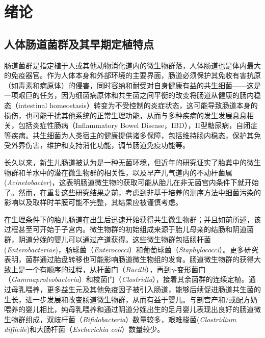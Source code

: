 
\chapter{绪论}
\label{chap:introduction}

\section{人体肠道菌群及其早期定植特点}
肠道菌群是指定植于人或其他动物消化道内的微生物群落，人体肠道也是体内最大的免疫器官。作为人体本身和外部环境的主要界面，肠道必须保护其免收有害抗原（如毒素和病原体）的侵害，同时容纳和耐受对自身健康有益的共生细菌——这是一项艰巨的任务，因为细菌病原体和共生菌之间平衡的改变将肠道从健康的肠内稳态（intestinal homeostasis）\cite{collier2005innate}转变为不受控制的炎症状态，这可能导致肠道本身的损伤，也可能干扰其他系统的正常生理功能，从而与多种疾病的发生发展息息相关，包括炎症性肠病（Inflammatory Bowel Disease，IBD）\cite{ni2017gut, yoo2017enteric}，II型糖尿病\cite{harsch2018role}，自闭症\cite{de2014altered, de2013fecal}等疾病。共生细菌为人类宿主的健康提供诸多保障，包括维持肠内稳态\cite{hooper2001commensal}，保护其免受外界伤害\cite{rakoff2004recognition}，维护和支持消化功能\cite{guarner2006mechanisms}，调节肠道免疫功能\cite{round2009gut,abreu2010toll}等。

长久以来，新生儿肠道被认为是一种无菌环境，但近年的研究证实了胎粪中的微生物群和羊水中的潜在微生物群的相关性\cite{ardissone2014meconium}，以及早产儿气道内的不动杆菌属(\textit{Acinetobacter})\cite{lohmann2014airway}，这表明肠道微生物的获取可能从胎儿在非无菌宫内条件下就开始了。然而，在重复这些研究结果之前，考虑到非基于培养的测序方法\cite{pennisi2014our}中细菌污染的影响以及取样时羊膜可能不完整，其结果应被谨慎考虑。

在生理条件下的胎儿肠道在出生后迅速开始获得共生微生物群；并且如前所述，该过程甚至可开始于子宫内。微生物群的初始组成来源于胎儿母亲的结肠和阴道菌群，阴道分娩的婴儿可以通过产道获得。这些微生物群包括肠杆菌(\textit{Enterobacteriae})，肠球菌（\textit{Enterococci}）和葡萄球菌（\textit{Staphylococci}）\cite{backhed2005host}。更多研究表明，菌群通过胎盘转移也可能影响肠道微生物组的发育\cite{aagaard2014placenta}。肠道微生物群的获得大致上是一个有顺序的过程，从杆菌门（\textit{Bacilli}），再到$\gamma$-变形菌门（\textit{Gammaproteobacteria}）和梭菌门（\textit{Clostridia}），接着其余菌群的连续定植\cite{la2014patterned}。通过母乳喂养，更多益生元及其他免疫因子被引入肠道，能够后续促进肠道共生菌的生长，进一步发展和改变肠道微生物群，从而有益于婴儿​​\cite{ouwehand2005prebiotics}。与剖宫产和/或配方奶喂养的婴儿相比，纯母乳喂养和通过阴道分娩出生的足月婴儿表现出良好的肠道微生物群组成，双歧杆菌（\textit{Bifidobacteria}）数量较多，艰难梭菌(\textit{Clostridium difficile})和大肠杆菌（\textit{Escherichia coli}）数量较少\cite{demehri2013hirschsprung}。


